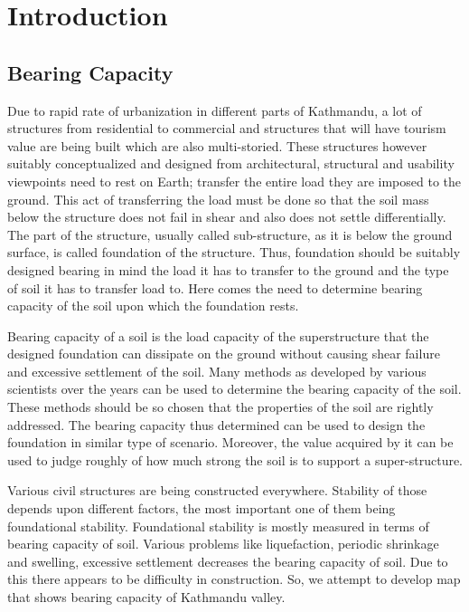 \chapter{Introduction}
\section{Bearing Capacity}
Due to rapid rate of urbanization in different parts of Kathmandu, a lot of structures from residential to commercial and structures that will have tourism value are being built which are also multi-storied. These structures however suitably conceptualized and designed from architectural, structural and usability viewpoints need to rest on Earth; transfer the entire load they are imposed to the ground. This act of transferring the load must be done so that the soil mass below the structure does not fail in shear and also does not settle differentially. The part of the structure, usually called sub-structure, as it is below the ground surface, is called foundation of the structure. Thus, foundation should be suitably designed bearing in mind the load it has to transfer to the ground and the type of soil it has to transfer load to. Here comes the need to determine bearing capacity of the soil upon which the foundation rests.

Bearing capacity of a soil is the load capacity of the superstructure that the designed foundation can dissipate on the ground without causing shear failure and excessive settlement of the soil. Many methods as developed by various scientists over the years can be used to determine the bearing capacity of the soil. These methods should be so chosen that the properties of the soil are rightly addressed. The bearing capacity thus determined can be used to design the foundation in similar type of scenario. Moreover, the value acquired by it can be used to judge roughly of how much strong the soil is to support a super-structure.

Various civil structures are being constructed everywhere. Stability of those depends upon different factors, the most important one of them being foundational stability. Foundational stability is mostly measured in terms of bearing capacity of soil. Various problems like liquefaction, periodic shrinkage and swelling, excessive settlement decreases the bearing capacity of soil. Due to this there appears to be difficulty in construction. So, we attempt to develop map that shows bearing capacity of Kathmandu valley.

